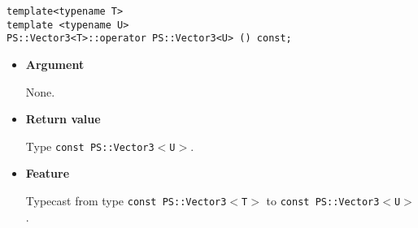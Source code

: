 \mbox{}

\begin{screen}
\begin{verbatim}
template<typename T>
template <typename U>
PS::Vector3<T>::operator PS::Vector3<U> () const;
\end{verbatim}
\end{screen}

\begin{itemize}

\item{{\bf Argument}}

  None.

\item{{\bf Return value}}

  Type \texttt{const PS::Vector3$<$U$>$}.

\item{{\bf Feature}}

  Typecast from type \texttt{const PS::Vector3$<$T$>$} to \texttt{const
  PS::Vector3$<$U$>$}.

\end{itemize}
